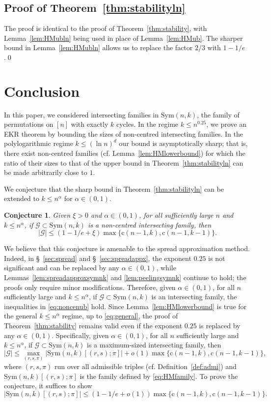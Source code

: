 \documentclass{amsart}
\newtheorem{conj}[thm]{Conjecture}
\newcommand{\mcal}{\mathcal}
\newcommand{\sym}{\mathrm{Sym}}
\newcommand{\st}{\mathrm{c}}
\begin{document}
\subsection*{Proof of Theorem~\ref{thm:stabilityln}} 
The proof is identical to the proof of Theorem~\ref{thm:stability}, with  Lemma~\ref{lem:HMubln} being used in place of Lemma~\ref{lem:HMub}. The sharper bound in Lemma~\ref{lem:HMubln} allows us to replace the factor $2/3$ with $1-1/e$.\qed

\section{Conclusion}\label{sec:conclusion}
In this paper, we considered intersecting families in $\sym(n,k)$, the family of permutations on $[n]$ with exactly $k$ cycles. In the regime $k\leq n^{0.25}$, we prove an EKR theorem by bounding the sizes of non-centred intersecting families. In the polylogarithmic regime $k\leq (\ln n)^{d}$ our bound is asymptotically sharp; that is, there exist non-centred families (cf. Lemma~\ref{lem:HMlowerbound}) for which the ratio of their sizes to that of the upper bound in Theorem~\ref{thm:stabilityln} can be made arbitrarily close to $1$. 

We conjecture that the sharp bound in Theorem~\ref{thm:stabilityln} can be extended to $k\leq n^{\alpha}$ for $\alpha \in (0,1)$.
\begin{conj}
Given $\xi>0$ and $\alpha \in (0,1)$, for all sufficiently large $n$ and $k\leq n^{\alpha}$, if $\mcal{G} \subset \sym(n,k)$ is a non-centred intersecting family, then
\[|\mcal{G}|\leq \left(1-1/e +\xi \right) \max\{\st(n-1,k),\st(n-1,k-1)\}.\]
\end{conj}

We believe that this conjecture is amenable to the spread approximation method. Indeed, in \S~\ref{sec:spread} and \S~\ref{sec:spreadappx}, the exponent $0.25$ is not significant and can be replaced by any  $\alpha \in (0,1)$, while Lemmas~\ref{lem:spreadapproxsymnk} and \ref{lem:peelingsymnk} continue to hold; the proofs only require minor modifications. Therefore, given $\alpha \in (0,1)$, for all $n$ sufficiently large and $k\leq n^{\alpha}$, if $\mcal{G}\subset \sym(n,k)$ is an intersecting family, the inequalities in \eqref{eq:noncenub} hold. Since Lemma~\ref{lem:HMlowerbound} is true for the general $k\leq n^{\alpha}$ regime, up to \eqref{eq:general}, the proof of Theorem~\ref{thm:stability} remains valid even if the exponent $0.25$ is replaced by any $\alpha \in (0,1)$. Specifically, given $\alpha\in (0,1)$, for all $n$ sufficiently large and $k\leq n^{\alpha}$, if $\mcal{G}\subset \sym(n,k)$ is a maximum-sized intersecting family, then 
\[|\mcal{G}| \leq \max\limits_{(r,s,\pi)} |\sym(n,k)[(r,s);\pi]| +o(1)\max\{\st(n-1,k), \st(n-1,k-1)\},\] where $(r,s,\pi)$ run over all admissible triples (cf. Definition~\ref{def:admi}) and $\sym(n,k)[(r,s);\pi]$ is the family defined by \eqref{eq:HMfamily}. To prove the conjecture, it suffices to show 
\begin{equation}\label{eq:hmconj}
|\sym(n,k)[(r,s);\pi]| \leq (1-1/e+o(1))\max\{\st(n-1,k), \st(n-1,k-1)\}.
\end{equation}
\end{document}
